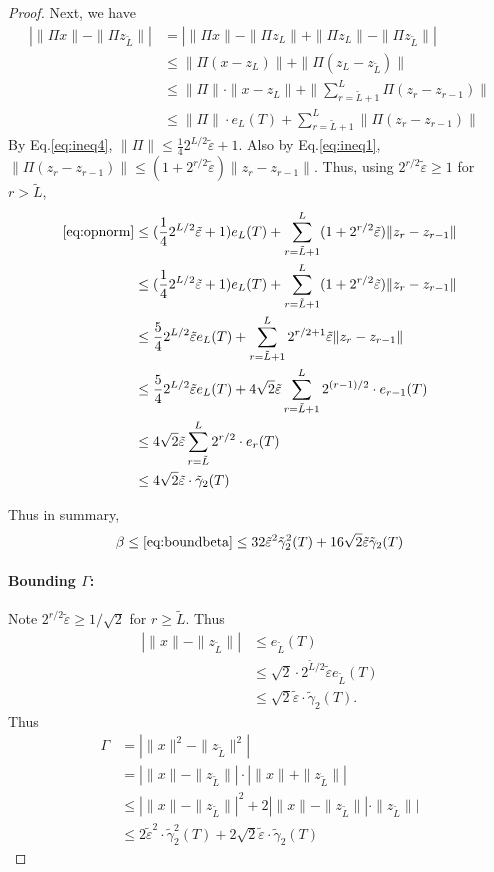 \documentclass[11pt]{article}
\newcommand{\teps}{\tilde \varepsilon}
\newcommand{\EquationName}[1]{\label{eq:#1}}
\newcommand{\Equation}[1]{Eq.\:\eqref{eq:#1}}
\newcommand{\Eqsub}[1]{\eqref{eq:#1}}
\begin{document}
\begin{proof}
Next, we have
\allowdisplaybreaks
\begin{align}
\nonumber |\|\Pi x\| - \|\Pi z_{\tilde{L}}\|| &= |\|\Pi x\| - \|\Pi z_L\| + \|\Pi z_L\| - \|\Pi z_{\tilde{L}}\||\\
\nonumber {}&\le \|\Pi (x-z_L)\| + \|\Pi (z_L - z_{\tilde{L}})\|\\
\nonumber {}&\le \|\Pi\|\cdot\|x-z_L\| + \|\sum_{r=\tilde{L}+1}^L \Pi (z_r - z_{r-1})\|\\
{}&\le \|\Pi\|\cdot e_L(T) + \sum_{r=\tilde{L}+1}^L \|\Pi (z_r - z_{r-1})\| \EquationName{opnorm}
\end{align}
By \Equation{ineq4}, $\|\Pi\| \le \frac 14 2^{L/2}\teps + 1$. Also by \Equation{ineq1}, $\|\Pi (z_r - z_{r-1})\| \le (1 + 2^{r/2}\teps)\|z_r - z_{r-1}\|$. Thus, using $2^{r/2}\teps \ge 1$ for $r > \tilde{L}$,
\begin{align}
\nonumber \Eqsub{opnorm} &\le (\frac 14 2^{L/2}\teps + 1)e_L(T) + \sum_{r=\tilde{L}+1}^L (1+ 2^{r/2}\teps)\|z_r - z_{r-1}\|\\
\nonumber {}&\le (\frac 14 2^{L/2}\teps + 1)e_L(T) + \sum_{r=\tilde{L}+1}^L (1+ 2^{r/2}\teps)\|z_r - z_{r-1}\|\\
\nonumber {}&\le \frac 54 2^{L/2}\teps e_L(T) + \sum_{r=\tilde{L}+1}^L 2^{r/2+1}\teps\|z_r - z_{r-1}\|\\
\nonumber {}&\le \frac 54 2^{L/2}\teps e_L(T) + 4\sqrt{2}\teps\sum_{r=\tilde{L}+1}^L 2^{(r-1)/2}\cdot e_{r-1}(T)\\
\nonumber {}&\le 4\sqrt{2}\teps\sum_{r=\tilde{L}}^L 2^{r/2}\cdot e_r(T)\\
{}&\le 4\sqrt{2}\teps \cdot \tilde{\gamma}_2(T) 
\end{align}

Thus in summary,
$$
\beta \le \Eqsub{boundbeta} \le 32\teps^2\tilde{\gamma}_2^2(T) + 16\sqrt{2}\teps\tilde{\gamma}_2(T)
$$

\paragraph{Bounding $\Gamma$:} 

Note $2^{r/2}\teps \ge 1/\sqrt{2}$ for $r\ge \tilde{L}$. Thus
\begin{align*}
|\|x\| - \|z_{\tilde{L}}\|| &\le e_{\tilde{L}}(T)\\
{}&\le \sqrt{2}\cdot 2^{\tilde{L}/2}\teps e_{\tilde{L}}(T)\\
{}&\le \sqrt{2}\teps\cdot \tilde{\gamma}_2(T) .
\end{align*}
Thus
\begin{align*}
\Gamma &= |\|x\|^2 - \|z_{\tilde{L}}\|^2|\\
{}&= |\|x\| - \|z_{\tilde{L}}\|| \cdot |\|x\| + \|z_{\tilde{L}}\||\\
{}&\le |\|x\| - \|z_{\tilde{L}}\||^2 + 2|\|x\| - \|z_{\tilde{L}}\||\cdot\|z_{\tilde{L}}\||\\
{}&\le 2\teps^2\cdot \tilde{\gamma}_2^2(T) + 2\sqrt{2}\teps\cdot \tilde{\gamma}_2(T)
\end{align*}


\end{proof}
\end{document}

